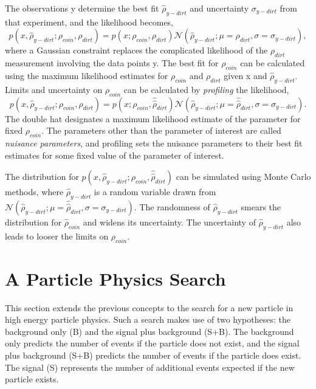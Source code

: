 The observations y determine the best fit $\hat{\rho}_{y-dirt}$ and uncertainty $\sigma_{y-dirt}$ from that experiment, and the likelihood becomes, 
\begin{equation}
p(x, \hat{\rho}_{y-dirt}; \rho_{coin}, \rho_{dirt}) = p(x; \rho_{coin}, \rho_{dirt})
                                   \mathcal{N}(\hat{\rho}_{y-dirt}; \mu=\rho_{dirt}, \sigma=\sigma_{y-dirt}),
\end{equation}
where a Gaussian constraint replaces the complicated likelihood of the $\rho_{dirt}$ measurement involving the data points y. The best fit for $\rho_{coin}$ can be calculated using the maximum likelihood estimates for $\rho_{coin}$ and $\rho_{dirt}$ given x and $\hat{\rho}_{y-dirt}$. Limits and uncertainty on $\rho_{coin}$ can be calculated by \textit{profiling} the likelihood,  
\begin{equation}
p(x, \hat{\rho}_{y-dirt}; \rho_{coin}, \hat{\hat{\rho}}_{dirt}) = p(x; \rho_{coin}, \hat{\hat{\rho}}_{dirt})
                                   \mathcal{N}(\hat{\rho}_{y-dirt}; \mu=\hat{\hat{\rho}}_{dirt}, \sigma=\sigma_{y-dirt}).
\end{equation}
The double hat designates a maximum likelihood estimate of the parameter for fixed $\rho_{coin}$. The parameters other than the parameter of interest are called \textit{nuisance parameters}, and profiling sets the nuisance parameters to their best fit estimates for some fixed value of the parameter of interest. 

The distribution for $p(x, \hat{\rho}_{y-dirt}; \rho_{coin}, \hat{\hat{\rho}}_{dirt})$ can be simulated using Monte Carlo methods, where $\hat{\rho}_{y-dirt}$ is a random variable drawn from $\mathcal{N}(\hat{\rho}_{y-dirt}; \mu=\hat{\hat{\rho}}_{dirt}, \sigma=\sigma_{y-dirt})$. The randomness of $\hat{\rho}_{y-dirt}$ smears the distribution for $\hat{\rho}_{coin}$ and widens its uncertainty. The uncertainty of $\hat{\rho}_{y-dirt}$ also leads to looser the limits on $\rho_{coin}$.

\section{A Particle Physics Search}

This section extends the previous concepts to the search for a new particle in high energy particle physics. Such a search makes use of two hypotheses: the background only (B) and the signal plus background (S+B). The background only predicts the number of events if the particle does not exist, and the signal plus background (S+B) predicts the number of events if the particle does exist. The signal (S) represents the number of additional events expected if the new particle exists.

